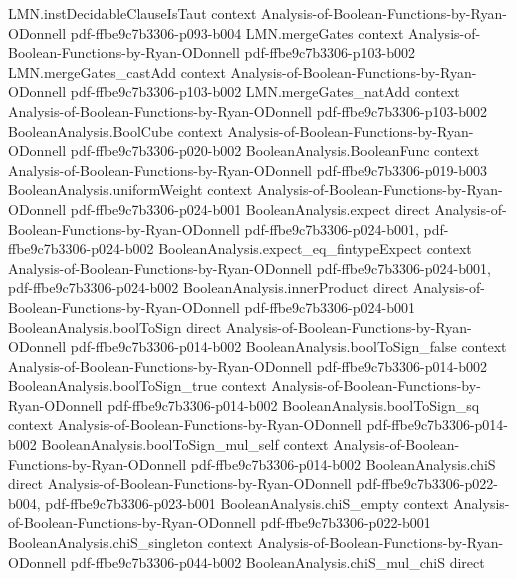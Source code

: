 \begin{theorem}
  {LMN.instDecidableClauseIsTaut}
  {context}
  {Analysis-of-Boolean-Functions-by-Ryan-ODonnell}
  {pdf-ffbe9c7b3306-p093-b004}
\proofstep
  {LMN.mergeGates}
  {context}
  {Analysis-of-Boolean-Functions-by-Ryan-ODonnell}
  {pdf-ffbe9c7b3306-p103-b002}
\proofstep
  {LMN.mergeGates_castAdd}
  {context}
  {Analysis-of-Boolean-Functions-by-Ryan-ODonnell}
  {pdf-ffbe9c7b3306-p103-b002}
\proofstep
  {LMN.mergeGates_natAdd}
  {context}
  {Analysis-of-Boolean-Functions-by-Ryan-ODonnell}
  {pdf-ffbe9c7b3306-p103-b002}
\proofstep
  {BooleanAnalysis.BoolCube}
  {context}
  {Analysis-of-Boolean-Functions-by-Ryan-ODonnell}
  {pdf-ffbe9c7b3306-p020-b002}
\proofstep
  {BooleanAnalysis.BooleanFunc}
  {context}
  {Analysis-of-Boolean-Functions-by-Ryan-ODonnell}
  {pdf-ffbe9c7b3306-p019-b003}
\proofstep
  {BooleanAnalysis.uniformWeight}
  {context}
  {Analysis-of-Boolean-Functions-by-Ryan-ODonnell}
  {pdf-ffbe9c7b3306-p024-b001}
\proofstep
  {BooleanAnalysis.expect}
  {direct}
  {Analysis-of-Boolean-Functions-by-Ryan-ODonnell}
  {pdf-ffbe9c7b3306-p024-b001,
    pdf-ffbe9c7b3306-p024-b002}
\proofstep
  {BooleanAnalysis.expect_eq_fintypeExpect}
  {context}
  {Analysis-of-Boolean-Functions-by-Ryan-ODonnell}
  {pdf-ffbe9c7b3306-p024-b001,
    pdf-ffbe9c7b3306-p024-b002}
\proofstep
  {BooleanAnalysis.innerProduct}
  {direct}
  {Analysis-of-Boolean-Functions-by-Ryan-ODonnell}
  {pdf-ffbe9c7b3306-p024-b001}
\proofstep
  {BooleanAnalysis.boolToSign}
  {direct}
  {Analysis-of-Boolean-Functions-by-Ryan-ODonnell}
  {pdf-ffbe9c7b3306-p014-b002}
\proofstep
  {BooleanAnalysis.boolToSign_false}
  {context}
  {Analysis-of-Boolean-Functions-by-Ryan-ODonnell}
  {pdf-ffbe9c7b3306-p014-b002}
\proofstep
  {BooleanAnalysis.boolToSign_true}
  {context}
  {Analysis-of-Boolean-Functions-by-Ryan-ODonnell}
  {pdf-ffbe9c7b3306-p014-b002}
\proofstep
  {BooleanAnalysis.boolToSign_sq}
  {context}
  {Analysis-of-Boolean-Functions-by-Ryan-ODonnell}
  {pdf-ffbe9c7b3306-p014-b002}
\proofstep
  {BooleanAnalysis.boolToSign_mul_self}
  {context}
  {Analysis-of-Boolean-Functions-by-Ryan-ODonnell}
  {pdf-ffbe9c7b3306-p014-b002}
\proofstep
  {BooleanAnalysis.chiS}
  {direct}
  {Analysis-of-Boolean-Functions-by-Ryan-ODonnell}
  {pdf-ffbe9c7b3306-p022-b004,
    pdf-ffbe9c7b3306-p023-b001}
\proofstep
  {BooleanAnalysis.chiS_empty}
  {context}
  {Analysis-of-Boolean-Functions-by-Ryan-ODonnell}
  {pdf-ffbe9c7b3306-p022-b001}
\proofstep
  {BooleanAnalysis.chiS_singleton}
  {context}
  {Analysis-of-Boolean-Functions-by-Ryan-ODonnell}
  {pdf-ffbe9c7b3306-p044-b002}
\proofstep
  {BooleanAnalysis.chiS_mul_chiS}
  {direct}

\end{theorem}
